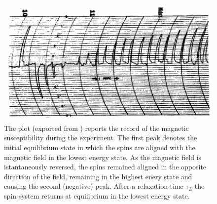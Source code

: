 \begin{figure}[htbp]
    \centering 
    \includegraphics[scale=0.5]{./images/PurcellPound.png}
    \caption{The plot (exported from \cite{PandP}) reports the record of the magnetic susceptibility during the experiment. The first peak denotes
    the initial equilibrium state in which the spins are aligned with the magnetic field in the lowest energy state. As the magnetic field is istantaneously reversed,
    the spins remained aligned in the opposite direction of the field, remaining in the highest enery state and causing the second (negative) peak. After a relaxation time
    $\tau_L$ the spin system returns at equilibrium in the lowest energy state.}
    \label{fig:PandP}
\end{figure}